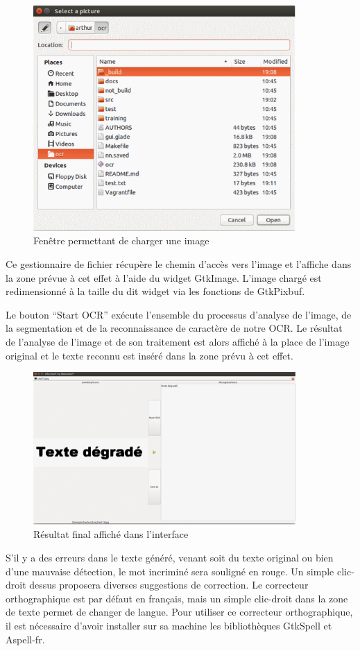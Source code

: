 \documentclass[11pt]{report}
\begin{document}
\begin{figure}[htbp]
\centering
\includegraphics[width=10cm]{gui-open-file.png}
\caption{Fenêtre permettant de charger une image}
\end{figure}

Ce gestionnaire de fichier récupère le chemin d'accès vers l’image et l’affiche dans la zone prévue à cet effet à l'aide du widget GtkImage. L'image chargé est redimensionné à la taille du dit widget via les fonctions de GtkPixbuf.

Le bouton ``Start OCR'' exécute l'ensemble du processus d'analyse de l'image, de la segmentation et de la reconnaissance de caractère de notre OCR. Le résultat de l'analyse de l'image et de son traitement est alors affiché à la place de l'image original et le texte reconnu est inséré dans la zone prévu à cet effet.

\begin{figure}[htbp]
\centering
\includegraphics[width=10cm]{gui-result.png}
\caption{Résultat final affiché dans l'interface}
\end{figure}

S’il y a des erreurs dans le texte généré, venant soit du texte original ou bien d’une mauvaise détection, le mot incriminé sera souligné en rouge. Un simple clic-droit dessus proposera diverses suggestions de correction. Le correcteur orthographique est par défaut en français, mais un simple clic-droit dans la zone de texte permet de changer de langue. Pour utiliser ce correcteur orthographique, il est nécessaire d'avoir installer sur sa machine les bibliothèques GtkSpell et Aspell-fr.
\end{document}
